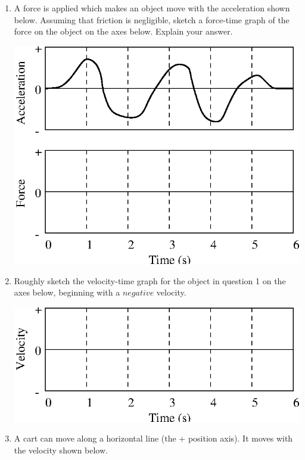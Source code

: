 \begin{enumerate}

\item A force is applied which makes an object move with the acceleration shown
below. Assuming that friction is negligible, sketch a force-time graph of the
force on the object on the axes below. Explain your answer.

\vspace{1.3cm}
{\includegraphics{iqsForce/force1_fig6.eps}}
\vspace{0.3cm}

\item Roughly sketch the velocity-time graph for the object in question 1 on the
axes below, beginning with a $negative$ velocity.

\vspace{0.3cm}
{\par\centering \includegraphics{iqsForce/force1_fig7.eps} \par}
\vspace{0.8cm}

\item A cart can move along a horizontal line (the + position axis). It moves with
the velocity shown below.


\end{enumerate}
